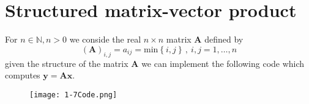 \documentclass{article}
\begin{document}
\section*{Structured matrix-vector product}
For $n \in \mathbb{N}, n > 0$ we conside the real $n \times n$ matrix $\mathbf{A}$ defined by
\begin{equation*}
    \left(\mathbf{A}\right)_{i,j} = a_{ij} = \text{min}\left\{i,j\right\}\, , \: i,j = 1,\dots, n 
\end{equation*}
given the structure of the matrix $\mathbf{A}$ we can implement the following code which computes $\mathbf{y} = \mathbf{A}\mathbf{x}$.
\begin{figure}[!hbt]
    \centering
\texttt{[image: 1-7Code.png]}
\end{figure}
\end{document}
